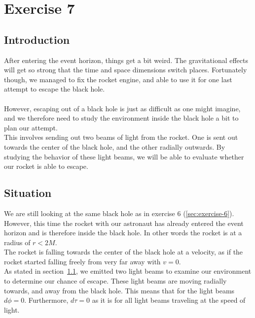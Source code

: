 \documentclass[reprint,english,notitlepage]{revtex4-2}
\begin{document}
\newpage
\section{Exercise 7}\label{sec:exercise-7}
    \subsection{Introduction}\label{subsec:introduction7}
        After entering the event horizon, things get a bit weird.
        The gravitational effects will get so strong that the time and space dimensions switch places.
        Fortunately though, we managed to fix the rocket engine, and able to use it for one last attempt to escape the black hole.\\\\
        However, escaping out of a black hole is just as difficult as one might imagine, and we therefore need to study the environment inside the black hole a bit to plan our attempt.\\
        This involves sending out two beams of light from the rocket.
        One is sent out towards the center of the black hole, and the other radially outwards.
        By studying the behavior of these light beams, we will be able to evaluate whether our rocket is able to escape.

    \subsection{Situation}\label{subsec:situation7}
        We are still looking at the same black hole as in exercise 6 (\ref{sec:exercise-6}).
        However, this time the rocket with our astronaut has already entered the event horizon and is therefore inside the black hole.
        In other words the rocket is at a radius of $r < 2M$.\\
        The rocket is falling towards the center of the black hole at a velocity, as if the rocket started falling freely from very far away with $v = 0$.\\
        As stated in section~\ref{subsec:introduction7}, we emitted two light beams to examine our environment to determine our chance of escape.
        These light beams are moving radially towards, and away from the black hole.
        This means that for the light beams $d\phi = 0$.
        Furthermore, $d\tau = 0$ as it is for all light beams traveling at the speed of light.
\end{document}
